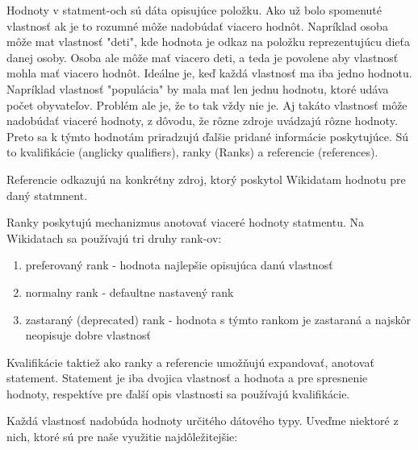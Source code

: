 Hodnoty v statment-och sú dáta opisujúce položku. Ako už bolo spomenuté vlastnosť
ak je to rozumné môže nadobúdať viacero hodnôt. Napríklad osoba môže mat vlastnosť "deti", kde hodnota
je odkaz na položku reprezentujúcu dieťa danej osoby. Osoba ale môže mať viacero deti, a teda je
povolene aby vlastnosť mohla mať viacero hodnôt.
Ideálne je, keď každá vlastnosť ma iba jedno hodnotu. Napríklad vlastnosť "populácia" by mala mať len jednu hodnotu,
ktoré udáva počet obyvateľov. Problém ale je, že to tak vždy nie je. Aj takáto vlastnosť môže nadobúdať viaceré hodnoty,
z dôvodu, že rôzne zdroje uvádzajú rôzne hodnoty. Preto sa k týmto hodnotám
priradzujú ďalšie pridané informácie poskytujúce. Sú to kvalifikácie (anglicky qualifiers), ranky (Ranks) a referencie (references).

Referencie odkazujú na konkrétny zdroj, ktorý poskytol Wikidatam hodnotu pre daný statmnent.

Ranky poskytujú mechanizmus anotovať viaceré hodnoty statmentu. Na Wikidatach sa používajú tri druhy rank-ov:

\begin{enumerate}
    \item preferovaný rank -  hodnota najlepšie opisujúca danú vlastnosť
    \item normalny rank - defaultne nastavený rank
    \item zastaraný (deprecated) rank - hodnota s týmto rankom je zastaraná a najskôr neopisuje dobre vlastnosť
\end{enumerate}

Kvalifikácie taktiež ako ranky a referencie umožňujú expandovať, anotovať statement. Statement je iba
dvojica vlastnosť a hodnota a pre spresnenie hodnoty, respektíve pre ďalší opis vlastnosti sa používajú kvalifikácie.

Každá vlastnosť nadobúda hodnoty určitého dátového typy. Uveďme niektoré z nich, ktoré sú pre naše využitie najdôležitejšie:

